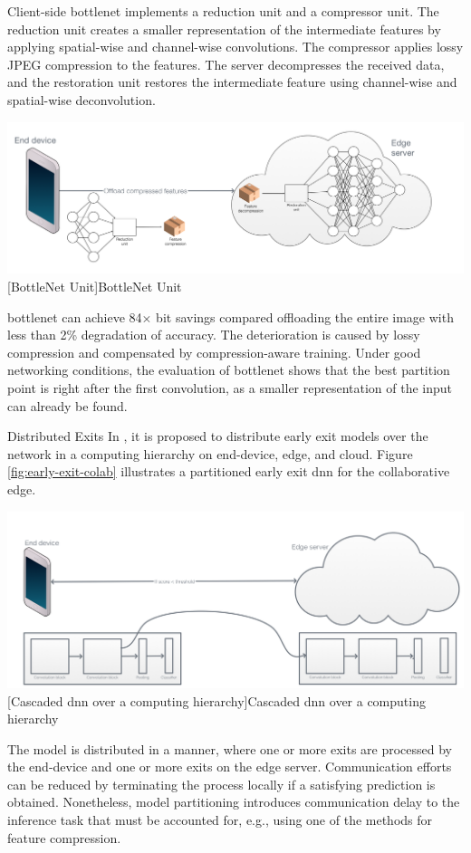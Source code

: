 \begin{enumdescript}
	Client-side \gls{bottlenet} implements a reduction unit and a compressor unit. The reduction unit creates a smaller representation of the intermediate features by applying spatial-wise and channel-wise convolutions. The compressor applies lossy JPEG compression to the features. The server decompresses the received data, and the restoration unit restores the intermediate feature using channel-wise and spatial-wise deconvolution.	
	\begin{minipage}[t]{\linewidth}
		\centering
		\includegraphics[width=.8\linewidth]{figures/models/bottlenet}
		[BottleNet Unit]{BottleNet Unit}
	\end{minipage}
	
	\gls{bottlenet} can achieve 84$\times$ bit savings compared offloading the entire image with less than 2\% degradation of accuracy. The deterioration is caused by lossy compression and compensated by compression-aware training. Under good networking conditions, the evaluation of \gls{bottlenet} shows that the best partition point is right after the first convolution, as a smaller representation of the input can already be found. 	
	\item[Distributed Exits] In \cite{leroux_cascading_2017,teerapittayanon_distributed_2017}, it is proposed to distribute early exit models over the network in a computing hierarchy on end-device, edge, and cloud. Figure \ref{fig:early-exit-colab} illustrates a partitioned early exit \gls{dnn} for the collaborative edge. 
	
	\begin{minipage}[t]{\linewidth}
		\centering
		\includegraphics[width=\linewidth]{figures/models/cascaded}
		[Cascaded \gls{dnn} over a computing hierarchy]{Cascaded \gls{dnn} over a computing hierarchy}
		\label{fig:early-exit-colab}
	\end{minipage}
	The model is distributed in a manner, where one or more exits are processed by the end-device and one or more exits on the edge server. Communication efforts can be reduced by terminating the process locally if a satisfying prediction is obtained. Nonetheless, model partitioning introduces communication delay to the inference task that must be accounted for, e.g., using one of the methods for feature compression.
	

\end{enumdescript}
